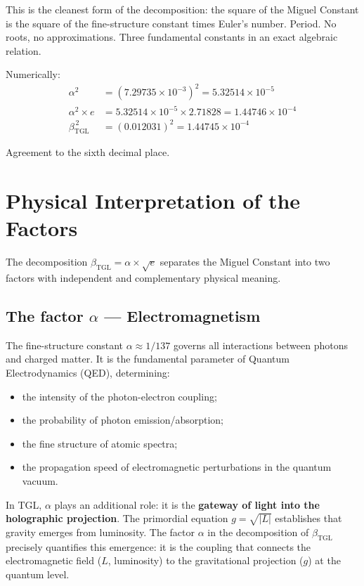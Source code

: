 \documentclass[12pt,a4paper,twoside]{article}
\newcommand{\betatgl}{\beta_{\!\scriptscriptstyle\mathrm{TGL}}}
\begin{document}
\noindent This is the cleanest form of the decomposition: the square of the Miguel Constant is the square of the fine-structure constant times Euler's number. Period. No roots, no approximations. Three fundamental constants in an exact algebraic relation.

Numerically:
\begin{align}
\alpha^2 &= (7.29735 \times 10^{-3})^2 = 5.32514 \times 10^{-5} \\
\alpha^2 \times e &= 5.32514 \times 10^{-5} \times 2.71828 = 1.44746 \times 10^{-4} \\
\betatgl^{\,2} &= (0.012031)^2 = 1.44745 \times 10^{-4}
\end{align}

Agreement to the sixth decimal place.



\section{Physical Interpretation of the Factors}
\label{sec:fatores}

The decomposition $\betatgl = \alpha \times \sqrt{e}$ separates the Miguel Constant into two factors with independent and complementary physical meaning.

\subsection{The factor $\alpha$ --- Electromagnetism}

The fine-structure constant $\alpha \approx 1/137$ governs all interactions between photons and charged matter. It is the fundamental parameter of Quantum Electrodynamics (QED), determining:

\begin{itemize}[nosep]
\item the intensity of the photon-electron coupling;
\item the probability of photon emission/absorption;
\item the fine structure of atomic spectra;
\item the propagation speed of electromagnetic perturbations in the quantum vacuum.
\end{itemize}

In TGL, $\alpha$ plays an additional role: it is the \textbf{gateway of light into the holographic projection}. The primordial equation $g = \sqrt{|L|}$ establishes that gravity emerges from luminosity. The factor $\alpha$ in the decomposition of $\betatgl$ precisely quantifies this emergence: it is the coupling that connects the electromagnetic field ($L$, luminosity) to the gravitational projection ($g$) at the quantum level.
\end{document}
